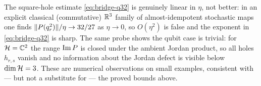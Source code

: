 \begin{remark}
\label{rem:bridge-numerics}
The square-hole estimate \eqref{eq:bridge-q32} is genuinely linear in $\eta$, not
better: in an explicit classical (commutative) $\mathbb{R}^3$ family of almost-idempotent
stochastic maps one finds $\lVert P(q_r^2) \rVert/\eta\to 32/27$ as $\eta\to0$, so
$O(\eta^2)$ is false and the exponent in \eqref{eq:bridge-q32} is sharp. The same
probe shows the qubit case is trivial: for $\mathcal{H}=\mathbb{C}^2$ the range $\operatorname{Im} P$ is
closed under the ambient Jordan product, so all holes $h_{r,s}$ vanish and no
information about the Jordan defect is visible below $\dim\mathcal{H}=3$. These are
numerical observations on small examples, consistent with --- but not a
substitute for --- the proved bounds above.
\end{remark}
